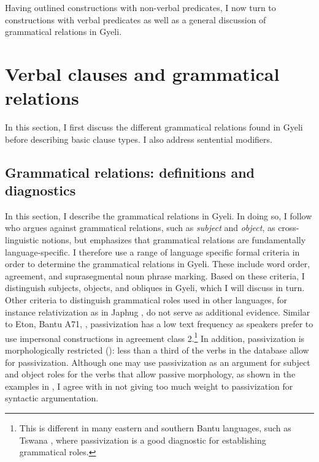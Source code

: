 \noindent Having outlined constructions with non-verbal predicates, I now turn to constructions with verbal predicates as well as a general discussion of grammatical relations in Gyeli.











\section{Verbal clauses and grammatical relations}
\label{sec:verbalC}

In this section, I first discuss the different grammatical relations found in Gyeli before describing basic clause types. I also address sentential modifiers.




\subsection[Grammatical relations]{Grammatical relations: definitions and diagnostics}
\label{sec:GR}

In this section, I describe the grammatical relations in Gyeli. In doing so, I follow \citet{dryer97} who argues against grammatical relations, such as {\itshape subject} and {\itshape object}, as cross-linguistic notions, but emphasizes that grammatical relations are fundamentally language-specific.
I therefore use a range of language specific formal criteria in order to determine the grammatical relations in Gyeli. These include word order, agreement, and suprasegmental noun phrase marking.  Based on these criteria, I distinguish subjects, objects, and obliques in Gyeli, which I will discuss in turn. Other criteria to distinguish grammatical roles used in other languages, for instance relativization as in Japhug \citep{jacques2016}, do not serve as additional evidence. Similar to Eton, Bantu A71, \citep[301]{velde2008}, passivization has a low text frequency as speakers prefer to use impersonal constructions in agreement class 2.\footnote{This is different in many eastern and southern Bantu languages, such as Tswana \citep{creissels2007}, where passivization is a good diagnostic for establishing grammatical roles.} In addition, passivization is morphologically restricted (): less than a third of the verbs in the database allow for passivization. Although one may use passivization as an argument for subject and object roles for the verbs that allow passive morphology, as shown in the examples in , I agree with \citet{velde2008} in not giving too much weight to passivization for syntactic argumentation. 






